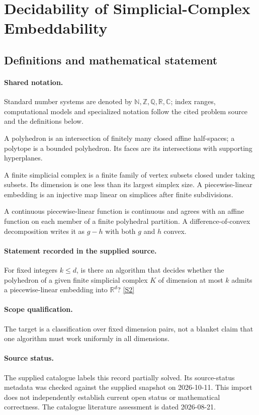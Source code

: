 \documentclass[11pt]{article}
\newcommand{\sref}[2]{\hyperlink{source:#1:#2}{[S#2]}}
\begin{document}
\section{Decidability of Simplicial-Complex Embeddability}\label{statement}

\subsection{Definitions and mathematical statement}

\paragraph{Shared notation.}Standard number systems are denoted by $\mathbb N,\mathbb Z,\mathbb Q,\mathbb R,\mathbb C$; index ranges, computational models and specialized notation follow the cited problem source and the definitions below.


A polyhedron is an intersection of finitely many closed affine half-spaces; a polytope is a bounded polyhedron. Its faces are its intersections with supporting hyperplanes.

A finite simplicial complex is a finite family of vertex subsets closed under taking subsets. Its dimension is one less than its largest simplex size. A piecewise-linear embedding is an injective map linear on simplices after finite subdivisions.

A continuous piecewise-linear function is continuous and agrees with an affine function on each member of a finite polyhedral partition. A difference-of-convex decomposition writes it as $g-h$ with both $g$ and $h$ convex.
\paragraph{Statement recorded in the supplied source.}
For fixed integers $k\leq d$, is there an algorithm that decides whether the polyhedron of a given finite simplicial complex $K$ of dimension at most $k$ admits a piecewise-linear embedding into $\mathbb R^d$? \sref{statement}{2}
\paragraph{Scope qualification.}
The target is a classification over fixed dimension pairs, not a blanket claim that one algorithm must work uniformly in all dimensions.
\paragraph{Source status.}
The supplied catalogue labels this record partially solved. Its source-status metadata was checked against the supplied snapshot on 2026-10-11. This import does not independently establish current open status or mathematical correctness. The catalogue literature assessment is dated 2026-08-21.
\end{document}
